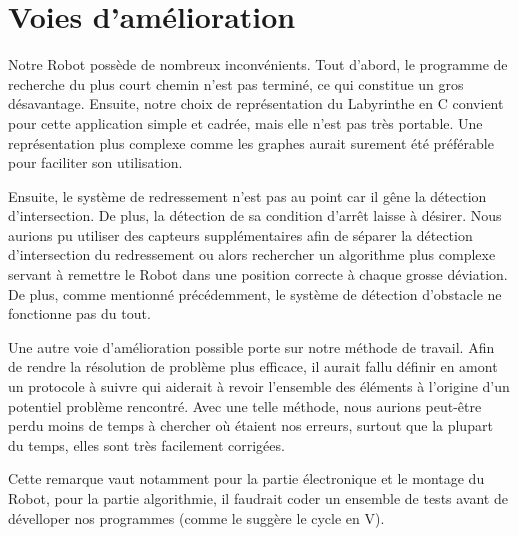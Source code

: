 \section{Voies d'amélioration}

Notre Robot possède de nombreux inconvénients.
Tout d'abord, le programme de recherche du plus court chemin n'est pas terminé, ce qui constitue un gros désavantage.
Ensuite, notre choix de représentation du Labyrinthe en C convient pour cette application simple et cadrée, mais elle n'est pas très portable.
Une représentation plus complexe comme les graphes aurait surement été préférable pour faciliter son utilisation. 

Ensuite, le système de redressement n'est pas au point car il gêne la détection d'intersection. De plus, la détection de sa condition d'arrêt laisse à désirer.
Nous aurions pu utiliser des capteurs supplémentaires afin de séparer la détection d'intersection du redressement ou alors rechercher un algorithme plus complexe servant à remettre le Robot dans une position correcte à chaque grosse déviation.
De plus, comme mentionné précédemment, le système de détection d'obstacle ne fonctionne pas du tout.

Une autre voie d'amélioration possible porte sur notre méthode de travail.
Afin de rendre la résolution de problème plus efficace, il aurait fallu définir en amont un protocole à suivre qui aiderait à revoir l'ensemble des éléments à l'origine d'un potentiel problème rencontré.
Avec une telle méthode, nous aurions peut-être perdu moins de temps à chercher où étaient nos erreurs, surtout que la plupart du temps, elles sont très facilement corrigées.

Cette remarque vaut notamment pour la partie électronique et le montage du Robot, pour la partie algorithmie, il faudrait coder un ensemble de tests avant de dévelloper nos programmes (comme le suggère le cycle en V).
